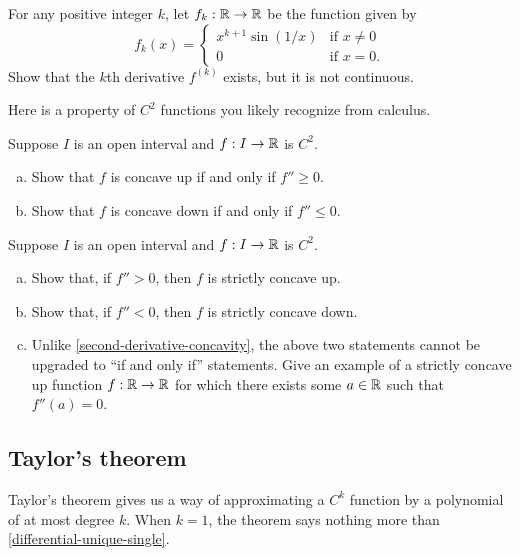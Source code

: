 \begin{exercise}
	For any positive integer $k$, let $f_k : \mathbb{R} \to \mathbb{R}$ be the function given by
	\[ f_k(x) = \begin{cases} x^{k+1} \sin(1/x) &  \text{if } x \neq 0 \\ 0 & \text{if } x = 0. \end{cases} \]
	Show that the $k$th derivative $f^{(k)}$ exists, but it is not continuous. 
\end{exercise}

Here is a property of $C^2$ functions you likely recognize from calculus. 

\begin{exercise} \label{second-derivative-concavity}
	Suppose $I$ is an open interval and $f : I \to \mathbb{R}$ is $C^2$. 
	\begin{enumerate}[(a)]
		\item Show that $f$ is concave up if and only if $f'' \geq 0$.
		\item Show that $f$ is concave down if and only if $f'' \leq 0$.  
	\end{enumerate}
\end{exercise}

\begin{exercise} \label{second-derivative-strict-concavity}
	Suppose $I$ is an open interval and $f : I \to \mathbb{R}$ is $C^2$. 
	\begin{enumerate}[(a)]
		\item Show that, if $f'' > 0$, then $f$ is strictly concave up.
		\item Show that, if $f'' < 0$, then $f$ is strictly concave down. 
		\item Unlike \cref{second-derivative-concavity}, the above two statements cannot be upgraded to ``if and only if'' statements. Give an example of a strictly concave up function $f : \mathbb{R} \to  \mathbb{R}$ for which there exists some $a \in \mathbb{R}$ such that $f''(a) = 0$. 
	\end{enumerate}
\end{exercise}

\subsection{Taylor's theorem \starred}

Taylor's theorem gives us a way of approximating a $C^k$ function by a polynomial of at most degree $k$. When $k = 1$, the theorem says nothing more than \cref{differential-unique-single}.

